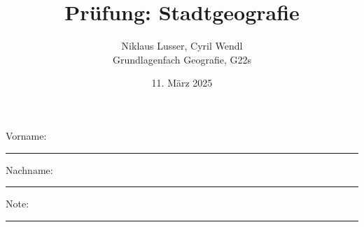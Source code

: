 \newtoggle{withbonus} \togglefalse{withbonus} %

\newcommand{\mycourse}{Grundlagenfach Geografie}
\newcommand{\myclass}{G22s}
\newcommand{\mydate}{11. März 2025}

\title{\textbf{Prüfung: Stadtgeografie}}
\author{Niklaus Lusser, Cyril Wendl\\
	\mycourse, \myclass}
\date{\mydate}
\maketitle
\thispagestyle{headandfoot}

\begin{center}
\end{center}
\vspace{10mm}

\begin{center}
	Vorname: \rule{45mm}{0.8pt}\qquad Nachname: \rule{45mm}{0.8pt}
\end{center}
\vspace{20mm}

\begin{center}
	\iftoggle{withbonus} {
		\combinedgradetable[h][questions]
	} {
		\gradetable[h][questions]
	}
\end{center}
\vspace{15mm}
\begin{center}
	Note:
	\vspace{10mm}

	\rule{8mm}{1.2pt}
\end{center}
\clearpage

